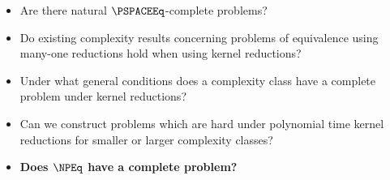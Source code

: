 \begin{itemize}
  \renewcommand{\labelitemi}{$\cdot$}
\item Are there natural $\PSPACEEq$-complete problems?
\item Do existing complexity results concerning problems of equivalence using many-one reductions hold when using kernel reductions?
\item Under what general conditions does a complexity class have a complete problem under kernel reductions?
\item Can we construct problems which are hard under polynomial time kernel reductions for smaller or larger complexity classes?
\item \textbf{Does $\NPEq$ have a complete problem?}
\end{itemize}

